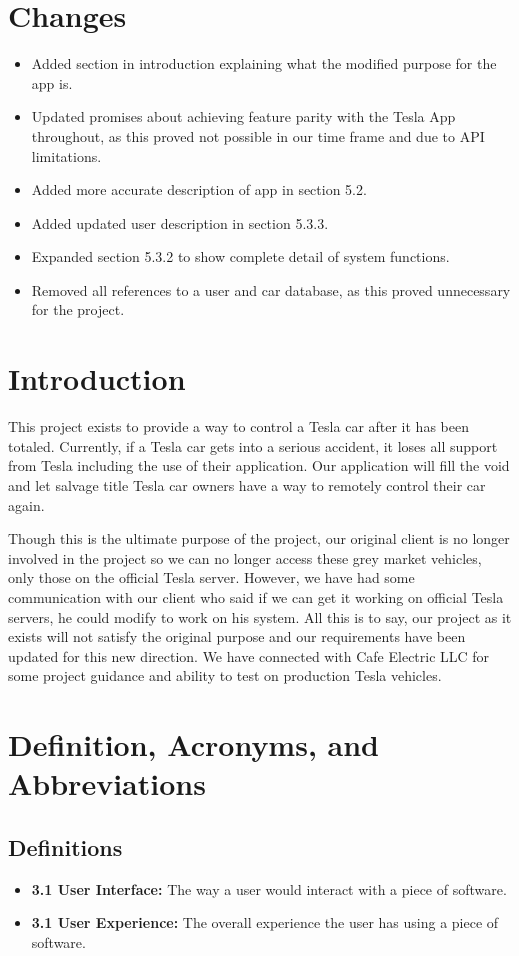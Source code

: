 \documentclass[onecolumn, draftclsnofoot,10pt, compsoc]{IEEEtran}
\begin{document}
\section{Changes}
\begin{itemize}
    \item Added section in introduction explaining what the modified purpose for the app is.
    \item Updated promises about achieving feature parity with the Tesla App throughout, as this proved not possible in our time frame and due to API limitations.
    \item Added more accurate description of app in section 5.2.
    \item Added updated user description in section 5.3.3.
    \item Expanded section 5.3.2 to show complete detail of system functions.
    \item Removed all references to a user and car database, as this proved unnecessary for the project.
\end{itemize}

\section{Introduction}
This project exists to provide a way to control a Tesla car after it has been totaled.
Currently, if a Tesla car gets into a serious accident, it loses all support from Tesla including the use of their application.
Our application will fill the void and let salvage title Tesla car owners have a way to remotely control their car again.

Though this is the ultimate purpose of the project, our original client is no longer involved in the project so we can no longer access these grey market vehicles, only those on the official Tesla server. However, we have had some communication with our client who said if we can get it working on official Tesla servers, he could modify to work on his system. All this is to say, our project as it exists will not satisfy the original purpose and our requirements have been updated for this new direction. We have connected with Cafe Electric LLC for some project guidance and ability to test on production Tesla vehicles.

\section{Definition, Acronyms, and Abbreviations}
\subsection{Definitions}
\begin{itemize}
    \item \textbf{3.1 User Interface:} The way a user would interact with a piece of software.
    \item \textbf{3.1 User Experience:} The overall experience the user has using a piece of software.
\end{itemize}
\end{document}
